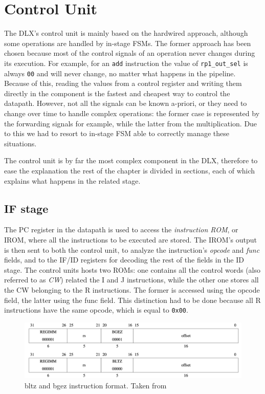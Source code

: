 \chapter{Control Unit}
\label{chap:cu}

The DLX's control unit is mainly based on the hardwired approach, although some operations are handled by in-stage FSMs. The former approach has been chosen
because most of the control signals of an operation never changes during its execution. For example, for an \verb|add| instruction the value of \verb|rp1_out_sel|
is always \verb|00| and will never change, no matter what happens in the pipeline. Because of this, reading the values from a control register and writing them directly in the
component is the fastest and cheapest way to control the datapath. However, not all the signals can be known a-priori, or they need to change over time to handle complex operations:
the former case is represented by the forwarding signals for example, while the latter from the multiplication. Due to this we had to resort to in-stage FSM able to correctly manage
these situations.

The control unit is by far the most complex component in the DLX, therefore to ease the explanation the rest of the chapter is divided in sections, each of which explains what happens
in the related stage. 

\section{IF stage}

The PC register in the datapath is used to access the {\it instruction ROM}, or IROM, where all the instructions to be executed are stored. The IROM's output is then sent to both the
control unit, to analyze the instruction's {\it opcode} and {\it func} fields, and to the IF/ID registers for decoding the rest of the fields in the ID stage.
The control units hosts two ROMs: one contains all the control words (also referred to as {\it CW}) related the I and J instructions, while the other one stores all the CW belonging
to the R instructions. The former is accessed using the opcode field, the latter using the func field. This distinction had to be done because all R instructions have the same opcode,
which is equal to \verb|0x00|.

\begin{figure}[!ht]
	\centering
	\includegraphics[width=\linewidth]{./chapters/figures/bltz_bgez.pdf}
    \caption{bltz and bgez instruction format. Taken from \cite{MIPS64_arch}}
    \label{fig:bltz_bgez}
\end{figure}

